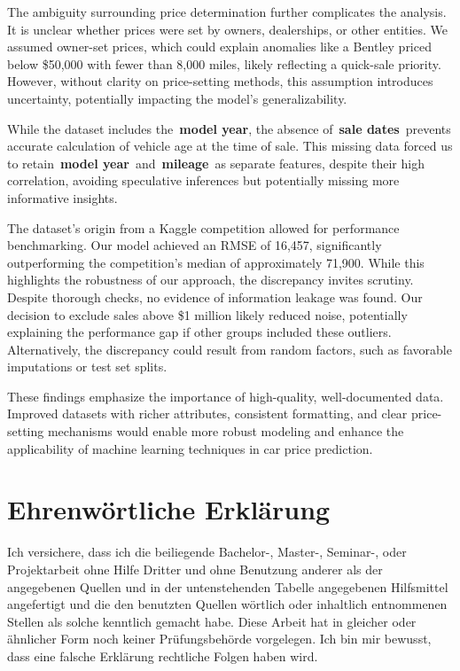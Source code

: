 \documentclass[a4paper,oneside,bibliography=totoc]{scrbook}
\begin{document}
The ambiguity surrounding price determination further complicates the analysis. It is unclear whether prices were set by owners, dealerships, or other entities. We assumed owner-set prices, which could explain anomalies like a Bentley priced below \$50,000 with fewer than 8,000 miles, likely reflecting a quick-sale priority. However, without clarity on price-setting methods, this assumption introduces uncertainty, potentially impacting the model's generalizability.

While the dataset includes the~\textbf{model year}, the absence of~\textbf{sale dates}~prevents accurate calculation of vehicle age at the time of sale. This missing data forced us to retain~\textbf{model year}~and~\textbf{mileage}~as separate features, despite their high correlation, avoiding speculative inferences but potentially missing more informative insights.

The dataset's origin from a Kaggle competition allowed for performance benchmarking. Our model achieved an RMSE of 16,457, significantly outperforming the competition's median of approximately 71,900. While this highlights the robustness of our approach, the discrepancy invites scrutiny. Despite thorough checks, no evidence of information leakage was found. Our decision to exclude sales above \$1 million likely reduced noise, potentially explaining the performance gap if other groups included these outliers. Alternatively, the discrepancy could result from random factors, such as favorable imputations or test set splits.

These findings emphasize the importance of high-quality, well-documented data. Improved datasets with richer attributes, consistent formatting, and clear price-setting mechanisms would enable more robust modeling and enhance the applicability of machine learning techniques in car price prediction.


\label{bibliography}

\backmatter
\chapter{Ehrenwörtliche Erklärung}
\label{cha:ehrenwoertlicheErklaerung}

Ich versichere, dass ich die beiliegende Bachelor-, Master-, Seminar-, oder
Projektarbeit ohne Hilfe Dritter und ohne Benutzung anderer als der angegebenen
Quellen und in der untenstehenden Tabelle angegebenen Hilfsmittel angefertigt
und die den benutzten Quellen wörtlich oder inhaltlich entnommenen Stellen als
solche kenntlich gemacht habe. Diese Arbeit hat in gleicher oder ähnlicher Form
noch keiner Prüfungsbehörde vorgelegen. Ich bin mir bewusst, dass eine falsche
Erklärung rechtliche Folgen haben wird.
\end{document}
